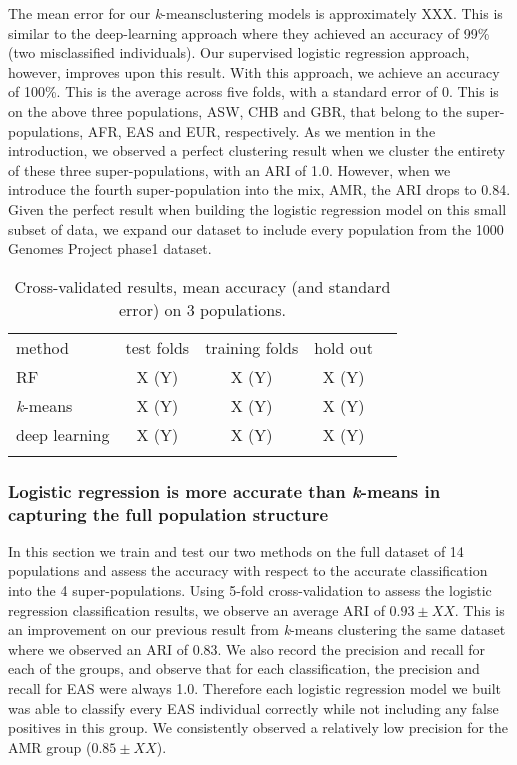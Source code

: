 \documentclass{llncs}
\newcommand{\kMeans}{\textit{k}-means}
\begin{document}
{The mean error for our \kMeans clustering models is approximately XXX. This is similar to the deep-learning approach where they achieved an accuracy of 99\% (two misclassified individuals). Our supervised logistic regression approach, however, improves upon this result.
With this approach, we achieve an accuracy of 100\%. This is the average across five folds, with a standard error of 0. This is on the above three populations, ASW, CHB and GBR, that belong to the super-populations, AFR, EAS and EUR, respectively.
As we mention in the introduction, we observed a perfect clustering result when we cluster the entirety of these three super-populations, with an ARI of 1.0. However, when we introduce the fourth super-population into the mix, AMR, the ARI drops to 0.84.
Given the perfect result when building the logistic regression model on this small subset of data, we expand our dataset to include every population from the 1000 Genomes Project phase1 dataset.  




\begin{table}
\caption{Cross-validated results, mean accuracy (and standard error) on 3 populations.}
\begin{center}
\renewcommand{\arraystretch}{1.4}
\setlength\tabcolsep{3pt}
\begin{tabular}{lcccc}
\hline\noalign{\smallskip}
method  & test folds & training folds & hold out \\
RF  & X (Y) & X (Y) & X (Y) \\
\kMeans & X (Y) & X (Y) & X (Y) \\
deep learning & X (Y) & X (Y) & X (Y) \\
\noalign{\smallskip}
\hline
\end{tabular}
\end{center}
\end{table}




\subsubsection{Logistic regression is more accurate than \kMeans{} in capturing the full population structure}
In this section we train and test our two methods on the full dataset of 14 populations and assess the accuracy with respect to the accurate classification into the 4 super-populations.
Using 5-fold cross-validation to assess the logistic regression classification results, we observe an average ARI of \(0.93 \pm{} XX\). This is an improvement on our previous result from \kMeans{} clustering the same dataset
where we observed an ARI of \(0.83\).
We also record the precision and recall for each of the groups, and observe that for each classification, the precision and recall for EAS were always 1.0. Therefore each logistic regression model we built was able to classify every EAS individual correctly while not including any false positives in this group.
We consistently observed a relatively low precision for the AMR group (\(0.85\pm{} XX \)). 


}
\end{document}
